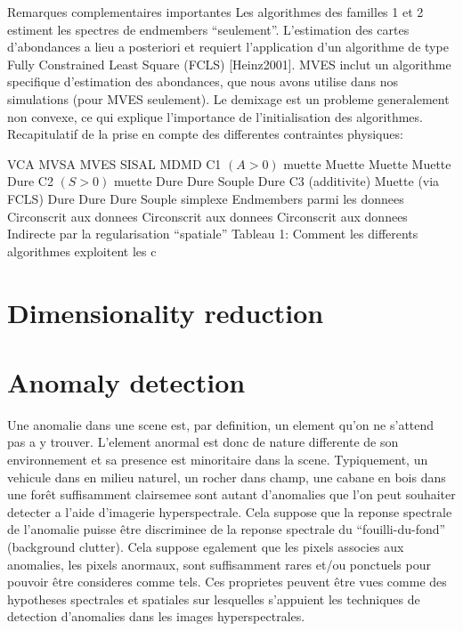 Remarques complementaires importantes Les algorithmes des familles 1
et 2 estiment les spectres de endmembers ``seulement''. L'estimation
des cartes d'abondances a lieu a posteriori et requiert l'application
d'un algorithme de type Fully Constrained Least Square (FCLS)
[Heinz2001]. MVES inclut un algorithme specifique d'estimation des
abondances, que nous avons utilise dans nos simulations (pour MVES
seulement).  Le demixage est un probleme generalement non convexe, ce
qui explique l'importance de l'initialisation des algorithmes.
Recapitulatif de la prise en compte des differentes contraintes
physiques:

VCA MVSA MVES SISAL MDMD C1 $(A>0)$ muette Muette Muette Muette Dure C2
$(S>0)$ muette Dure Dure Souple Dure C3 (additivite) Muette (via FCLS)
Dure Dure Dure Souple simplexe Endmembers parmi les donnees
Circonscrit aux donnees Circonscrit aux donnees Circonscrit aux
donnees Indirecte par la regularisation ``spatiale'' Tableau 1:
Comment les differents algorithmes exploitent les c
\section{Dimensionality reduction}

\section{Anomaly detection}
Une anomalie dans une scene est, par definition, un element qu'on ne
s'attend pas a y trouver. L'element anormal est donc de nature
differente de son environnement et sa presence est minoritaire dans la
scene. Typiquement, un vehicule dans en milieu naturel, un rocher dans
champ, une cabane en bois dans une forêt suffisamment clairsemee sont
autant d'anomalies que l'on peut souhaiter detecter a l'aide
d'imagerie hyperspectrale. Cela suppose que la reponse spectrale de
l'anomalie puisse être discriminee de la reponse spectrale du
``fouilli-du-fond'' (background clutter). Cela suppose egalement que
les pixels associes aux anomalies, les pixels anormaux, sont
suffisamment rares et/ou ponctuels pour pouvoir être consideres comme
tels. Ces proprietes peuvent être vues comme des hypotheses spectrales
et spatiales sur lesquelles s'appuient les techniques de detection
d'anomalies dans les images hyperspectrales.

